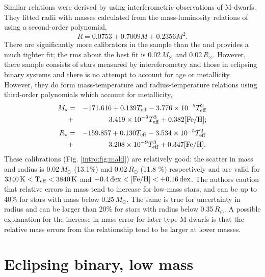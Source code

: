 Similar relations were derived by \citet{2015A&A...577A.132M} using interferometric observations of M-dwarfs. They fitted radii with masses calculated from the mass-luminosity relations of \citet{1993AJ....106..773H} using a second-order polynomial,
%
\begin{equation}
    R = 0.0753 + 0.7009 M + 0.2356M^2.
\end{equation}
%
There are significantly more calibrators in the \citet{2015A&A...577A.132M} sample than the \citet{2009MNRAS.394..272S} and provides a much tighter fit; the rms about the best fit is 0.02\,$M_\odot$ and 0.02\,$R_\odot$. However, there sample consists of stars measured by intereferometry and those in eclipsing binary systems and there is no attempt to account for age or metallicity. However, they do form mass-temperature and radius-temperature relations using third-order polynomials which account for metallicity,
%
\begin{eqnarray}
    M_\star &=& -171.616 + 0.139 T_{\rm eff} - 3.776 \times 10^{-5} T_{\rm eff}^2 \nonumber \\
    &+&3.419 \times 10^{-9} T_{\rm eff}^3 + 0.382 \rm [Fe/H];
\end{eqnarray}
\begin{eqnarray}
    R_\star &=& -159.857 + 0.130 T_{\rm eff} - 3.534 \times 10^{-5} T_{\rm eff}^2 \nonumber \\
    &+&3.208 \times 10^{-9} T_{\rm eff}^3 + 0.347 \rm [Fe/H].
\end{eqnarray}
%
These calibrations (Fig. \ref{intro:fig:mald}) are relatively good: the scatter in mass and radius is 0.02\,$M_\odot$ (13.1\%) and 0.02\,$R_\odot$ (11.8 \%) respectively and are valid for $3340 \, \rm K < T_{\rm eff} < 3840\, \rm K$ and $-0.4 \, \rm dex < \rm [Fe/H] < +0.16\, \rm dex $. The authors caution that relative errors in mass tend to increase for low-mass stars, and can be up to 40\% for stars with mass below 0.25\,$M_\odot$. The same is true for uncertainty in radius and can be larger than 20\% for stars with radius below 0.35\,$R_\odot$. A possible explanation for the increase in mass error for later-type M-dwarfs is that the relative mass errors from the \citet{1993AJ....106..773H} relationship tend to be larger at lower masses.


\section{Eclipsing binary, low mass}\label{introduction:EBLM}

